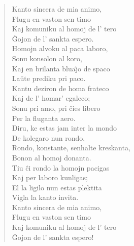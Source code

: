 \begin{verse}
                     Kanto sincera de mia animo,\\
                     Flugu en vaston sen timo\\
                     Kaj komuniku al homoj de l' tero\\
                     \^Gojon de l' sankta espero.\\
                     Homojn alvoku al paca laboro,\\
                     Sonu konsolon al koro,\\
                     Kaj en brilanta blua\^{\j}o de spaco\\
                     La\u ute prediku pri paco.\\
                     Kantu deziron de homa frateco\\
                     Kaj de l' homar' egaleco;\\
                     Sonu pri amo, pri \^cies libero\\
                     Per la fluganta aero.\\
                     Diru, ke estas jam inter la mondo\\
                     De kolegaro nun rondo,\\
                     Rondo, konstante, senhalte kreskanta,\\
                     Bonon al homoj donanta.\\
                     Tiu \^ci rondo la homojn pacigas\\
                     Kaj per laboro kunligas;\\
                     El la ligilo nun estas plektita\\
                     Vigla la kanto invita.\\
                     Kanto sincera de mia animo,\\
                     Flugu en vaston sen timo\\
                     Kaj komuniku al homoj de l' tero\\
                     \^Gojon de l' sankta espero!

\end{verse}

\smallrule{}
